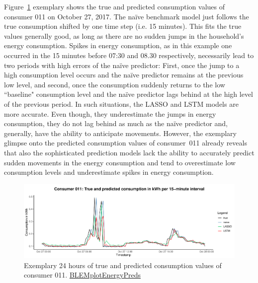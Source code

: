 Figure~\ref{Fig:glimpse_predcons} exemplary shows the true and predicted consumption values of consumer 011 on October 27, 2017. The na\"ive benchmark model just follows the true consumption shifted by one time step (i.e. 15 minutes). This fits the true values generally good, as long as there are no sudden jumps in the household's energy consumption. Spikes in energy consumption, as in this example one occurred in the 15 minutes before 07:30 and 08.30 respectively, necessarily lead to two periods with high errors of the na\"ive predictor: First, once the jump to a high consumption level occurs and the na\"ive predictor remains at the previous low level, and second, once the consumption suddenly returns to the low ``baseline" consumption level and the na\"ive predictor lags behind at the high level of the previous period. In such situations, the LASSO and LSTM models are more accurate. Even though, they underestimate the jumps in energy consumption, they do not lag behind as much as the na\"ive predictor and, generally, have the ability to anticipate movements. However, the exemplary glimpse onto the predicted consumption values of consumer~011 already reveals that also the sophisticated prediction models lack the ability to accurately predict sudden movements in the energy consumption and tend to overestimate low consumption levels and underestimate spikes in energy consumption.
%
\begin{figure}[htbp]
    \centering
    \includegraphics[width=\textwidth]{thesis/graphs/evaluation/c011_pred_cons.pdf}
    \caption[Exemplary 24 hours of true and predicted consumption values]{Exemplary 24 hours of true and predicted consumption values of consumer 011. \quantnet\href{ }{BLEMplotEnergyPreds}}
    \label{Fig:glimpse_predcons}
\end{figure}
%

